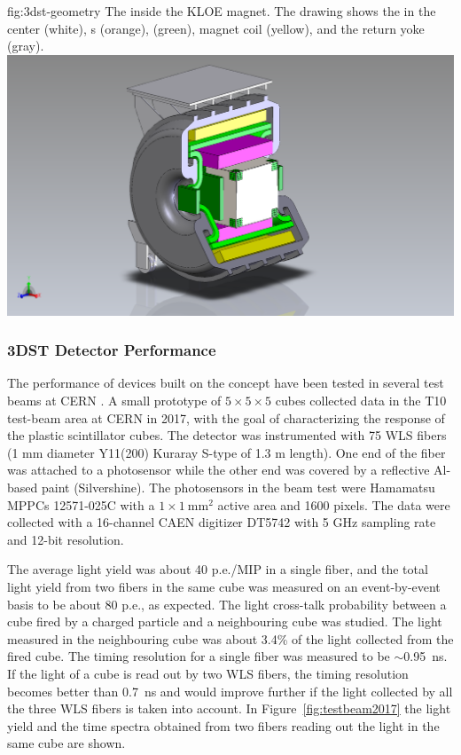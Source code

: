 \begin{dunefigure}{fig:3dst-geometry}
{The  inside the KLOE magnet. The drawing shows the  in the center (white), s (orange),  (green), magnet coil (yellow), and the return yoke (gray).}
  \includegraphics[width=7.in]{graphics/3DST-KLOE2019-08-01.png}
\end{dunefigure}


\subsubsection{3DST Detector Performance}

The performance of devices built on the  concept have been tested in several test beams at CERN \cite{Mineev:2018ekk}.
A small prototype of $5\times5\times5$ cubes collected data in the T10 test-beam area at CERN in 2017, with the goal of characterizing the response of the plastic scintillator cubes.
The detector was instrumented with 75 WLS fibers (1 mm diameter Y11(200) Kuraray S-type of 1.3 m length). One end of the fiber was attached to a photosensor while the other end was covered by a reflective Al-based paint (Silvershine). The photosensors in the beam test were Hamamatsu MPPCs 12571-025C with a $1\times1~\text{mm}^2$ active area and 1600 pixels. The data were collected with a 16-channel CAEN digitizer DT5742 with 5 GHz sampling rate and 12-bit resolution.

The average light yield was about 40 p.e./MIP in a single fiber, and the total light yield from two fibers in the same cube was measured on an event-by-event basis to be about 80 p.e., as expected.
The light cross-talk probability between a cube fired by a charged particle and a neighbouring cube was studied. The light measured in the neighbouring cube was about 3.4\% of the light collected from the fired cube. 
The timing resolution for a single fiber was measured to be $\sim$0.95~ns. If the light of a cube is read out by two WLS fibers, the timing resolution becomes better than 0.7~ns and would improve further if the light collected by all the three WLS fibers is taken into account.
In Figure~\ref{fig:testbeam2017} the light yield and the time spectra obtained from two fibers reading out the light in the same cube are shown.

